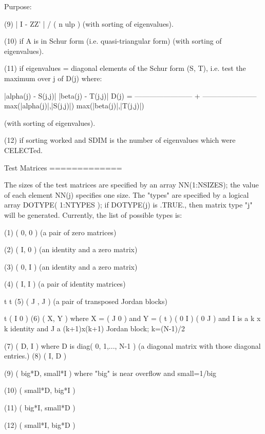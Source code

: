\begin{DoxyParagraph}{Purpose\+: }
\begin{DoxyVerb}
 (9)   | I - ZZ' | / ( n ulp ) (with sorting of eigenvalues).

 (10)  if A is in Schur form (i.e. quasi-triangular form)
       (with sorting of eigenvalues).

 (11)  if eigenvalues = diagonal elements of the Schur form (S, T),
       i.e. test the maximum over j of D(j)  where:

                     |alpha(j) - S(j,j)|        |beta(j) - T(j,j)|
           D(j) = ------------------------ + -----------------------
                  max(|alpha(j)|,|S(j,j)|)   max(|beta(j)|,|T(j,j)|)

       (with sorting of eigenvalues).

 (12)  if sorting worked and SDIM is the number of eigenvalues
       which were CELECTed.

 Test Matrices
 =============

 The sizes of the test matrices are specified by an array
 NN(1:NSIZES); the value of each element NN(j) specifies one size.
 The "types" are specified by a logical array DOTYPE( 1:NTYPES ); if
 DOTYPE(j) is .TRUE., then matrix type "j" will be generated.
 Currently, the list of possible types is:

 (1)  ( 0, 0 )         (a pair of zero matrices)

 (2)  ( I, 0 )         (an identity and a zero matrix)

 (3)  ( 0, I )         (an identity and a zero matrix)

 (4)  ( I, I )         (a pair of identity matrices)

         t   t
 (5)  ( J , J  )       (a pair of transposed Jordan blocks)

                                     t                ( I   0  )
 (6)  ( X, Y )         where  X = ( J   0  )  and Y = (      t )
                                  ( 0   I  )          ( 0   J  )
                       and I is a k x k identity and J a (k+1)x(k+1)
                       Jordan block; k=(N-1)/2

 (7)  ( D, I )         where D is diag( 0, 1,..., N-1 ) (a diagonal
                       matrix with those diagonal entries.)
 (8)  ( I, D )

 (9)  ( big*D, small*I ) where "big" is near overflow and small=1/big

 (10) ( small*D, big*I )

 (11) ( big*I, small*D )

 (12) ( small*I, big*D )


\end{DoxyVerb}
\end{DoxyParagraph}
